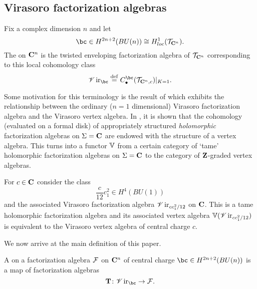 \documentclass[11pt]{amsart}
\newcommand{\Vir}{\sV\op{ir}}
\renewcommand{\op}{\operatorname}
\begin{document}
\subsection{Virasoro factorization algebras}

\begin{dfn}\label{dfn:vir}
Fix a complex dimension $n$ and let
\begin{equation}
\bc \in H^{2n+2}(BU(n)) \cong H^1_{loc}(\cT_{\C^n}) .
\end{equation}
The  on $\mathbf{C}^n$ is the twisted enveloping factorization algebra of $\mathcal T_{\mathbf{C}^n}$ corresponding to this local cohomology class
\begin{equation}
\Vir_{\bc} \define C_\bu^{\bc}(\cT_{\C^n,c})|_{K=1} .
\end{equation}
\end{dfn}

Some motivation for this terminology is the result of \cite{BWvir} which exhibits the relationship between the ordinary ($n=1$ dimensional) Virasoro factorization algebra and the Virasoro vertex algebra.
In \cite{CG1}, it is shown that the cohomology (evaluated on a formal disk) of appropriately structured \textit{holomorphic} factorization algebras on $\Sigma=\mathbf{C}$ are endowed with the structure of a vertex algebra.
This turns into a functor $\mathbb V$ from a certain category of `tame' holomorphic factorization algebras on $\Sigma = \mathbf{C}$ to the category of $\mathbf{Z}$-graded vertex algebras.

\begin{thm}
For $c \in \mathbf{C}$ consider the class
\begin{equation}
\frac{c}{12} c_1^2 \in H^4(BU(1))
\end{equation}
and the associated Virasoro factorization algebra $\Vir_{c c_1^2/12}$ on $\mathbf{C}$.
This is a tame holomorphic factorization algebra and its associated vertex algebra $\VV(\Vir_{c c_1^2/12})$ is equivalent to the Virasoro vertex algebra of central charge $c$.
\end{thm}

We now arrive at the main definition of this paper.

\begin{dfn}\label{dfn:hol}
A  on a factorization algebra $\mathcal F$ on $\mathbf{C}^n$ of central charge $\bc \in H^{2n+2}(BU(n))$ is a map of factorization algebras
\begin{equation}
\bT \colon \Vir_{\bc} \to \cF .
\end{equation}
\end{dfn}
\end{document}
